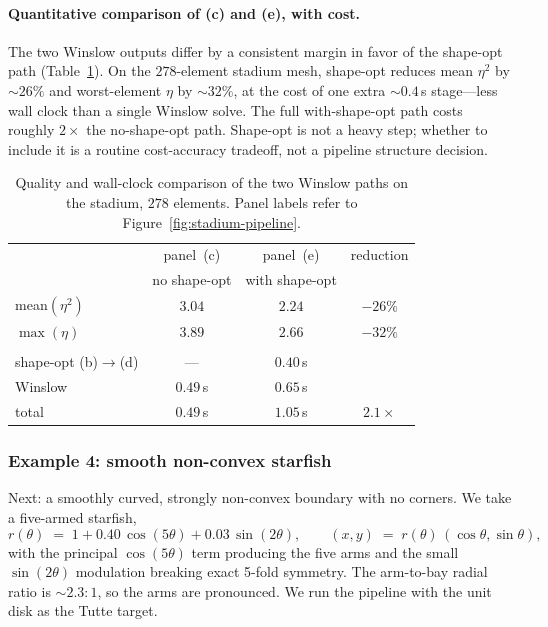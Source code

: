 \documentclass[11pt]{article}
\begin{document}
\paragraph{Quantitative comparison of (c) and (e), with cost.}
The two Winslow outputs differ by a consistent margin in favor
of the shape-opt path (Table~\ref{tab:stadium-comparison}). On
the $278$-element stadium mesh, shape-opt reduces mean $\eta^2$
by $\sim 26\%$ and worst-element $\eta$ by $\sim 32\%$, at the
cost of one extra $\sim 0.4$\,s stage---less wall clock than a
single Winslow solve. The full with-shape-opt path costs
roughly $2\times$ the no-shape-opt path. Shape-opt is not a
heavy step; whether to include it is a routine cost-accuracy
tradeoff, not a pipeline structure decision.

\begin{table}[htbp]
  \centering
  \caption{Quality and wall-clock comparison of the two
  Winslow paths on the stadium, $278$ elements. Panel labels
  refer to Figure~\ref{fig:stadium-pipeline}.}
  \label{tab:stadium-comparison}
  \begin{tabular}{lccc}
    \toprule
    & panel~(c) & panel~(e) & reduction \\
    & no shape-opt & with shape-opt & \\
    \midrule
    mean$(\eta^2)$  & $3.04$ & $2.24$ & $-26\%$ \\
    $\max(\eta)$    & $3.89$ & $2.66$ & $-32\%$ \\
    \addlinespace
    \multicolumn{4}{l}{\textit{Wall-clock time:}} \\
    shape-opt (b)$\to$(d)  & ---    & $0.40$\,s & \\
    Winslow                 & $0.49$\,s & $0.65$\,s & \\
    total                   & $0.49$\,s & $1.05$\,s & $2.1\times$ \\
    \bottomrule
  \end{tabular}
\end{table}

\subsubsection{Example 4: smooth non-convex starfish}
\label{sec:tutte-ex-starfish}

Next: a smoothly curved, strongly non-convex boundary with no
corners. We take a five-armed starfish,
\begin{equation*}
  r(\theta) \;=\; 1 + 0.40\,\cos(5\theta) + 0.03\,\sin(2\theta),
  \qquad
  (x, y) \;=\; r(\theta)\,(\cos\theta, \sin\theta),
\end{equation*}
with the principal $\cos(5\theta)$ term producing the five arms
and the small $\sin(2\theta)$ modulation breaking exact 5-fold
symmetry. The arm-to-bay radial ratio is $\sim 2.3\!:\!1$, so
the arms are pronounced. We run the pipeline with the unit disk
as the Tutte target.
\end{document}
